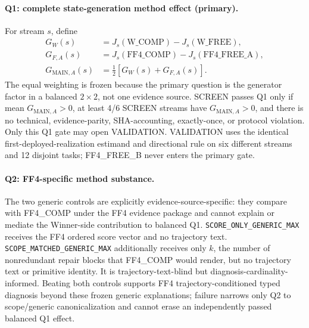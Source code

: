 \paragraph{Q1: complete state-generation method effect (primary).}
For stream $s$, define
\begin{align}
G_W(s) &= J_s(\text{W\_COMP})-J_s(\text{W\_FREE}),\\
G_{F,A}(s) &= J_s(\text{FF4\_COMP})-J_s(\text{FF4\_FREE\_A}),\\
G_{\mathrm{MAIN},A}(s) &= \tfrac{1}{2}\left[G_W(s)+G_{F,A}(s)\right].
\end{align}
The equal weighting is frozen because the primary question is the generator factor in a balanced $2\times2$, not one evidence source. SCREEN passes Q1 only if mean $G_{\mathrm{MAIN},A}>0$, at least 4/6 SCREEN streams have $G_{\mathrm{MAIN},A}>0$, and there is no technical, evidence-parity, SHA-accounting, exactly-once, or protocol violation. Only this Q1 gate may open VALIDATION. VALIDATION uses the identical first-deployed-realization estimand and directional rule on six different streams and 12 disjoint tasks; FF4\_FREE\_B never enters the primary gate.

\paragraph{Q2: FF4-specific method substance.}
The two generic controls are explicitly evidence-source-specific: they compare with FF4\_COMP under the FF4 evidence package and cannot explain or mediate the Winner-side contribution to balanced Q1. \texttt{SCORE\_ONLY\_GENERIC\_MAX} receives the FF4 ordered score vector and no trajectory text. \texttt{SCOPE\_MATCHED\_GENERIC\_MAX} additionally receives only $k$, the number of nonredundant repair blocks that FF4\_COMP would render, but no trajectory text or primitive identity. It is trajectory-text-blind but diagnosis-cardinality-informed. Beating both controls supports FF4 trajectory-conditioned typed diagnosis beyond these frozen generic explanations; failure narrows only Q2 to scope/generic canonicalization and cannot erase an independently passed balanced Q1 effect.

